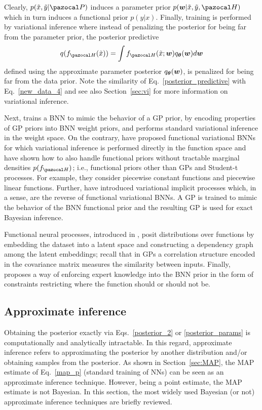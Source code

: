 Clearly, $p(\tilde{x},\tilde{y}|\cP)$ induces a parameter prior $p(\bw|\tilde{x},\tilde{y},\cH)$ which in turn induces a functional prior $p(y|x)$. 
Finally, training is performed by variational inference where instead of penalizing the posterior for being far from the parameter prior, the posterior predictive
\begin{equation}\label{posterior_predictive}
	q(f_{\cH}(\tilde{x}))=\int f_{\cH}(\tilde{x};\bw)q_{\bth}(\bw) d\bw 
\end{equation}
defined using the approximate parameter posterior $q_{\boldsymbol{\theta}}(\boldsymbol{w})$, is penalized for being far from the data prior.
Note the similarity of Eq.~\eqref{posterior_predictive} with Eq.~\eqref{new_data_4} and see also Section~\ref{sec:vi} for more information on variational inference.

Next, \textcite{flam-shepherd2017mapping} trains a BNN to mimic the behavior of a GP prior, by encoding properties of GP priors into BNN weight priors, and performs standard variational inference in the weight space. 
On the contrary, \textcite{sun2019functional} have proposed functional variational BNNs for which variational inference is performed directly in the function space and have shown how to also handle functional priors without tractable marginal densities $p(f_{\cH})$; i.e., functional priors other than GPs and Student-t processes. For example, they consider piecewise constant functions and piecewise linear functions. 
Further, \textcite{ma2019variational} have introduced variational implicit processes which, in a sense, are the reverse of functional variational BNNs. 
A GP is trained to mimic the behavior of the BNN functional prior and the resulting GP is used for exact Bayesian inference. 

Functional neural processes, introduced in \textcite{louizos2019functional}, posit distributions over functions by embedding the dataset into a latent space and constructing a dependency graph among the latent embeddings; recall that in GPs a correlation structure encoded in the covariance matrix measures the similarity between inputs.
Finally, \textcite{yang2019outputconstrained} proposes a way of enforcing expert knowledge into the BNN prior in the form of constraints restricting where the function should or should not be. 

\subsection{Approximate inference}\label{sec:inference}
Obtaining the posterior exactly via Eqs.~\eqref{posterior_2} or \eqref{posterior_params} is computationally and analytically intractable. 
In this regard, approximate inference refers to approximating the posterior by another distribution and/or obtaining samples from the posterior. 
As shown in Section~\ref{sec:MAP}, the MAP estimate of Eq.~\eqref{map_p} (standard training of NNs) can be seen as an approximate inference technique. 
However, being a point estimate, the MAP estimate is not Bayesian. 
In this section, the most widely used Bayesian (or not) approximate inference techniques are briefly reviewed. 

